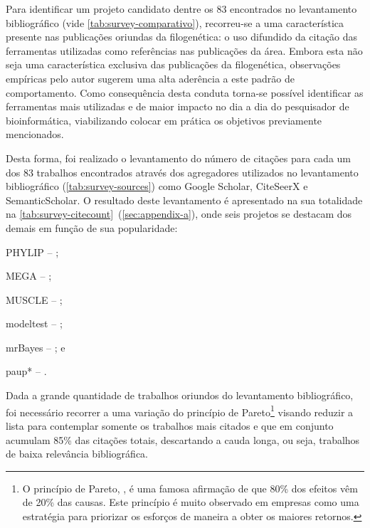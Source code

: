 \documentclass[english,brazilian]{UNISINOSmonografia} %
\begin{document}
Para identificar um projeto candidato dentre os 83 encontrados no levantamento bibliográfico (vide \autoref{tab:survey-comparativo}), recorreu-se a uma característica presente nas publicações oriundas da filogenética: o uso difundido da citação das ferramentas utilizadas como referências nas publicações da área.
Embora esta não seja uma característica exclusiva das publicações da filogenética, observações empíricas pelo autor sugerem uma alta aderência a este padrão de comportamento.
Como consequência desta conduta torna-se possível identificar as ferramentas mais utilizadas e de maior impacto no dia a dia do pesquisador de bioinformática, viabilizando colocar em prática os objetivos previamente mencionados.


Desta forma, foi realizado o levantamento do número de citações para cada um dos 83 trabalhos encontrados através dos agregadores utilizados no levantamento bibliográfico (\autoref{tab:survey-sources}) como Google Scholar, CiteSeerX e SemanticScholar.
O resultado deste levantamento é apresentado na sua totalidade na \autoref{tab:survey-citecount}~(\autoref{sec:appendix-a}),
onde seis projetos se destacam dos demais em função de sua popularidade:
\begin{inparaenum} 
	\item PHYLIP 	-- ;
	\item MEGA 		-- ;
	\item MUSCLE 	-- ;
	\item modeltest -- ;
	\item mrBayes 	-- ; e
	\item paup* 	-- .
\end{inparaenum}
Dada a grande quantidade de trabalhos oriundos do levantamento bibliográfico, foi necessário recorrer a uma variação do princípio de Pareto\footnote{
	O princípio de Pareto, \cite{ParetoPrinciple}, é uma famosa afirmação de que 80\% dos efeitos vêm de 20\% das causas. Este princípio é muito observado em empresas como uma estratégia para priorizar os esforços de maneira a obter os maiores retornos.
} visando reduzir a lista para contemplar somente os trabalhos mais citados e que em conjunto acumulam 85\% das citações totais, descartando a cauda longa, ou seja, trabalhos de baixa relevância bibliográfica.
\end{document}
